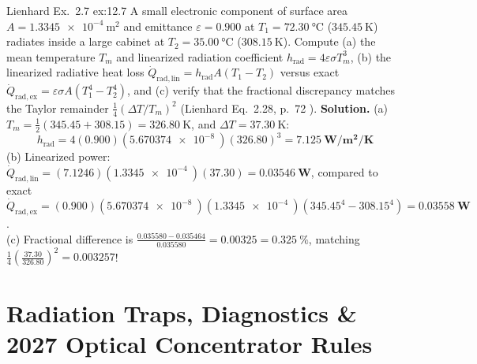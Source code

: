 \begin{workedexample}{Lienhard Ex.\ 2.7 }{ex:12.7}
A small electronic component of surface area $A = \SI{1.3345e-4}{\square\meter}$ and emittance $\varepsilon = 0.900$ at $T_1 = \SI{72.30}{\celsius}$ ($\SI{345.45}{\kelvin}$) radiates inside a large cabinet at $T_2 = \SI{35.00}{\celsius}$ ($\SI{308.15}{\kelvin}$). Compute (a) the mean temperature $T_m$ and linearized radiation coefficient $h_{\mathrm{rad}} = 4\varepsilon\sigma T_m^3$, (b) the linearized radiative heat loss $\dot{Q}_{\mathrm{rad,lin}} = h_{\mathrm{rad}}A(T_1 - T_2)$ versus exact $\dot{Q}_{\mathrm{rad,ex}} = \varepsilon\sigma A(T_1^4 - T_2^4)$, and (c) verify that the fractional discrepancy matches the Taylor remainder $\frac{1}{4}(\Delta T/T_m)^2$ (Lienhard Eq.~2.28, p.~72 ).
\tcblower
\textbf{Solution.} (a) $T_m = \frac{1}{2}(345.45 + 308.15) = \SI{326.80}{\kelvin}$, and $\Delta T = \SI{37.30}{\kelvin}$:
\[
  h_{\mathrm{rad}} = 4(0.900)(\SI{5.670374e-8}{})(326.80)^3 = \mathbf{\SI{7.125}{\watt\per\square\meter\per\kelvin}}
\]
(b) Linearized power: $\dot{Q}_{\mathrm{rad,lin}} = (7.1246)(\SI{1.3345e-4}{})(37.30) = \mathbf{\SI{0.03546}{\watt}}$, compared to exact $\dot{Q}_{\mathrm{rad,ex}} = (0.900)(\SI{5.670374e-8}{})(\SI{1.3345e-4}{})(345.45^4 - 308.15^4) = \mathbf{\SI{0.03558}{\watt}}$.\\
(c) Fractional difference is $\frac{0.035580 - 0.035464}{0.035580} = \mathbf{0.00325} = \SI{0.325}{\percent}$, matching $\frac{1}{4}\!\left(\frac{37.30}{326.80}\right)^{\!2} = \mathbf{0.003257}$!
\end{workedexample}

\section{Radiation Traps, Diagnostics \& 2027 Optical Concentrator Rules}
\label{sec:12.4}


